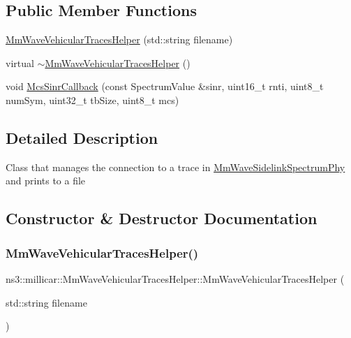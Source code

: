 \subsection*{Public Member Functions}
\begin{DoxyCompactItemize}
\item 
\hyperlink{classns3_1_1millicar_1_1MmWaveVehicularTracesHelper_a097af2d4d714d26e5ed0f59f8ccaf9b7}{Mm\+Wave\+Vehicular\+Traces\+Helper} (std\+::string filename)
\item 
virtual \hyperlink{classns3_1_1millicar_1_1MmWaveVehicularTracesHelper_a55e4a6ddb57f316b089e8995e7647ef3}{$\sim$\+Mm\+Wave\+Vehicular\+Traces\+Helper} ()
\item 
void \hyperlink{classns3_1_1millicar_1_1MmWaveVehicularTracesHelper_a8f438f5c50ef9bf2c9dd10a9cb731845}{Mcs\+Sinr\+Callback} (const Spectrum\+Value \&sinr, uint16\+\_\+t rnti, uint8\+\_\+t num\+Sym, uint32\+\_\+t tb\+Size, uint8\+\_\+t mcs)
\end{DoxyCompactItemize}


\subsection{Detailed Description}
Class that manages the connection to a trace in \hyperlink{classns3_1_1millicar_1_1MmWaveSidelinkSpectrumPhy}{Mm\+Wave\+Sidelink\+Spectrum\+Phy} and prints to a file 

\subsection{Constructor \& Destructor Documentation}
\mbox{\label{classns3_1_1millicar_1_1MmWaveVehicularTracesHelper_a097af2d4d714d26e5ed0f59f8ccaf9b7}} 
\subsubsection{\texorpdfstring{Mm\+Wave\+Vehicular\+Traces\+Helper()}{MmWaveVehicularTracesHelper()}}
{\footnotesize\ttfamily ns3\+::millicar\+::\+Mm\+Wave\+Vehicular\+Traces\+Helper\+::\+Mm\+Wave\+Vehicular\+Traces\+Helper (\begin{DoxyParamCaption}\item[{std\+::string}]{filename }\end{DoxyParamCaption})}

